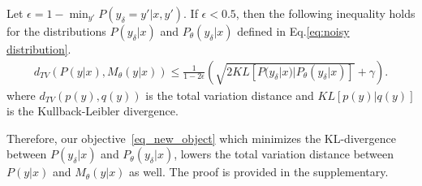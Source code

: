 \begin{theorem}
\label{thm:dtv bound}
Let $\epsilon = 1-\min_{y'}P(y_\delta=y' | x, y')$.
If $\epsilon < 0.5$, then the following inequality holds for the distributions $P(y_\delta|x)$ and $P_\theta(y_\delta|x) $ defined in Eq.\eqref{eq:noisy distribution}.
\begin{align}
    d_{TV}(P(y|x), M_\theta(y|x)) \leq 
    \frac{1}{1-2\epsilon}
    \left(\sqrt{2KL[P(y_\delta|x)|P_\theta(y_\delta|x)]}
    + \gamma  \right).\label{eq:dtv_bound}
\end{align}
where $d_{TV}(p(y),q(y))$ is the total variation distance and $KL[p(y)|q(y)]$ is the Kullback-Leibler divergence.
\end{theorem}

Therefore, our objective~\eqref{eq_new_object} which minimizes the KL-divergence between $P(y_\delta|x)$ and $P_\theta(y_\delta|x)$, lowers the total variation distance between  $P(y|x)$ and $M_\theta(y|x)$ as well. The proof is provided in the supplementary.


